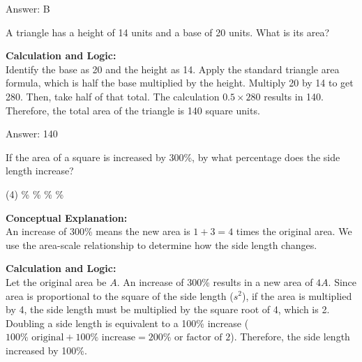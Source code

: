 \documentclass[11pt,paper=a4,answers]{exam}
\begin{document}
\begin{questions}
\begin{solution}
\vspace{30pt}

Answer: \colorbox{yellow!100}{B}
\end{solution}

\vspace{60pt}

\question
A triangle has a height of 14 units and a base of 20 units. What is its area?

\begin{solution}
\textbf{Calculation and Logic:} \\
Identify the base as 20 and the height as 14. Apply the standard triangle area formula, which is half the base multiplied by the height. Multiply 20 by 14 to get 280. Then, take half of that total. The calculation $0.5 \times 280$ results in 140. Therefore, the total area of the triangle is 140 square units.

\vspace{30pt}

Answer: \colorbox{yellow!100}{140}
\end{solution}

\vspace{60pt}

\question
If the area of a square is increased by 300\%, by what percentage does the side length increase?
\begin{tasks}(4)
    \%
    \%
    \%
    \%
\end{tasks}

\begin{solution}
\textbf{Conceptual Explanation:} \\
An increase of 300\% means the new area is $1 + 3 = 4$ times the original area. We use the area-scale relationship to determine how the side length changes.

\vspace{30pt}

\textbf{Calculation and Logic:} \\
Let the original area be $A$. An increase of 300\% results in a new area of $4A$. Since area is proportional to the square of the side length ($s^2$), if the area is multiplied by 4, the side length must be multiplied by the square root of 4, which is 2. Doubling a side length is equivalent to a 100\% increase ($100\% \text{ original} + 100\% \text{ increase} = 200\% \text{ or factor of 2}$). Therefore, the side length increased by 100\%.


\end{solution}
\end{questions}
\end{document}
